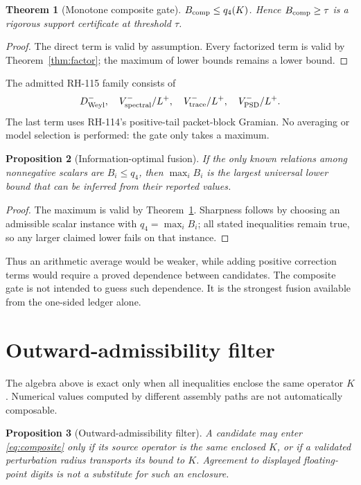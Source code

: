 \documentclass[12pt]{article}
\newtheorem{theorem}{Theorem}\newtheorem{proposition}[theorem]{Proposition}\newtheorem{remark}[theorem]{Remark}
\begin{document}
\begin{theorem}[Monotone composite gate]\label{thm:composite}
$B_{\rm comp}\leq q_4(K)$.  Hence $B_{\rm comp}\geq\tau$ is a rigorous
support certificate at threshold $\tau$.
\end{theorem}
\begin{proof}
The direct term is valid by assumption.  Every factorized term is valid by
Theorem~\ref{thm:factor}; the maximum of lower bounds remains a lower bound.
\end{proof}

The admitted RH-115 family consists of
\[
 D^-_{\rm Weyl},\quad
 V^-_{\rm spectral}/L^+,\quad
 V^-_{\rm trace}/L^+,\quad
 V^-_{\rm PSD}/L^+.
\]
The last term uses RH-114's positive-tail packet-block Gramian.  No averaging
or model selection is performed: the gate only takes a maximum.

\begin{proposition}[Information-optimal fusion]\label{prop:optimal}
If the only known relations among nonnegative scalars are
$B_i\leq q_4$, then $\max_iB_i$ is the largest universal lower bound that can
be inferred from their reported values.
\end{proposition}
\begin{proof}
The maximum is valid by Theorem~\ref{thm:composite}.  Sharpness follows by
choosing an admissible scalar instance with $q_4=\max_iB_i$; all stated
inequalities remain true, so any larger claimed lower fails on that instance.
\end{proof}

Thus an arithmetic average would be weaker, while adding positive correction
terms would require a proved dependence between candidates.  The composite
gate is not intended to guess such dependence.  It is the strongest fusion
available from the one-sided ledger alone.

\section{Outward-admissibility filter}
The algebra above is exact only when all inequalities enclose the same
operator $K$.  Numerical values computed by different assembly paths are not
automatically composable.

\begin{proposition}[Outward-admissibility filter]\label{prop:filter}
A candidate may enter \eqref{eq:composite} only if its source operator is the
same enclosed $K$, or if a validated perturbation radius transports its bound
to $K$.  Agreement to displayed floating-point digits is not a substitute
for such an enclosure.
\end{proposition}
\end{document}
